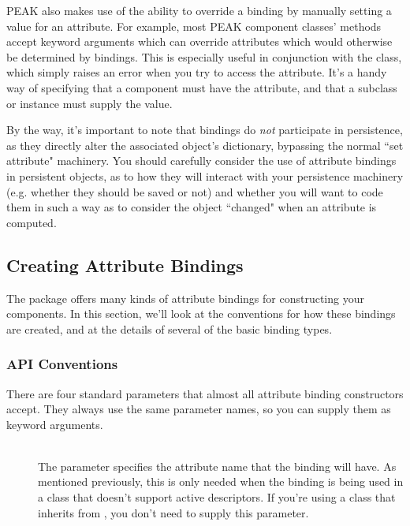 \begin{verbatim%
}
\begin{verbatim%
}
\begin{verbatim%
}
\begin{verbatim%
}
\begin{verbatim%
}
\begin{verbatim%
}
\begin{verbatim%
}
\begin{verbatim%
}
\begin{verbatim%
}
PEAK also makes use of the ability to override a binding by manually setting
a value for an attribute.  For example, most PEAK component classes'
 methods accept keyword arguments which can override attributes
which would otherwise be determined by bindings.  This is especially useful in
conjunction with the  class, which simply
raises an error when you try to access the attribute.  It's a handy way of
specifying that a component must have the attribute, and that a subclass or
instance must supply the value.

By the way, it's important to note that bindings do \emph{not} participate in
persistence, as they directly alter the associated object's dictionary,
bypassing the normal ``set attribute" machinery.  You should carefully
consider the use of attribute bindings in persistent objects, as to how they
will interact with your persistence machinery (e.g. whether they should be
saved or not) and whether you will want to code them in such a way as to
consider the object ``changed" when an attribute is computed.




\subsection{Creating Attribute Bindings}

The  package offers many kinds of attribute bindings for
constructing your components.  In this section, we'll look at the conventions
for how these bindings are created, and at the details of several of the basic
binding types.

\subsubsection{API Conventions}

There are four standard parameters that almost all attribute binding
constructors accept.  They always use the same parameter names, so you can
supply them as keyword arguments.

\begin{description}

\item[] \hfill \\
The  parameter specifies the attribute name that the binding will
have.  As mentioned previously, this is only needed when the binding is being
used in a class that doesn't support active descriptors.  If you're using
a class that inherits from , you don't need to supply
this parameter.


\end{description}
\end{verbatim%
}
\end{verbatim%
}
\end{verbatim%
}
\end{verbatim%
}
\end{verbatim%
}
\end{verbatim%
}
\end{verbatim%
}
\end{verbatim%
}
\end{verbatim%
}
